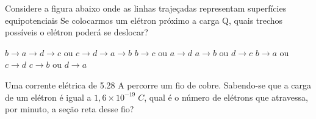 \documentclass[12pt, addpoints]{exam}
\begin{document}
    \begin{questions}
\begin{multicols*}{2}
\question Considere a figura abaixo onde as linhas trajeçadas representam superfícies equipotenciais Se colocarmos um elétron próximo a carga Q, quais trechos possíveis o elétron poderá se deslocar?
        
        \begin{center}
            \begin{minipage}[c]{0.5\linewidth}
            \end{minipage}
        \end{center}
        
        

\begin{choices}
\choice $b\rightarrow a\rightarrow d\rightarrow c$ ou $c\rightarrow d\rightarrow a\rightarrow b$ 
\choice $b\rightarrow c$ ou $a\rightarrow d$ 
\choice $a\rightarrow b$ ou $d\rightarrow c$ 
\choice $b\rightarrow a$ ou $c\rightarrow d$ 
\choice $c\rightarrow b$ ou $d\rightarrow a$ 
\end{choices}
\question Uma corrente elétrica de    5.28 A percorre um ﬁo de cobre. Sabendo-se que a carga de um elétron é igual a $1,6\times 10^{-19}\;C$, qual é o número de elétrons que atravessa, por minuto, a seção reta desse ﬁo?


\end{multicols*}
\end{questions}
\end{document}
